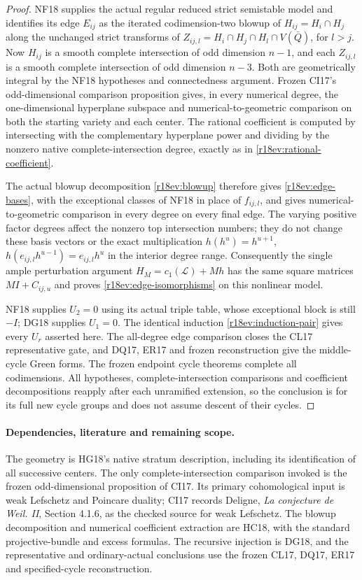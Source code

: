 \begin{proof}
NF18 supplies the actual regular reduced strict semistable
model and identifies its edge $E_{ij}$ as the iterated
codimension-two blowup of
$H_{ij}=H_i\cap H_j$ along the unchanged strict transforms
of $Z_{ij,l}=H_i\cap H_j\cap H_l\cap V(\bar Q)$,
for $l>j$.
Now $H_{ij}$ is a smooth complete intersection of odd
dimension $n-1$, and each $Z_{ij,l}$ is a smooth complete
intersection of odd dimension $n-3$.  Both are geometrically
integral by the NF18 hypotheses and connectedness argument.
Frozen CI17's odd-dimensional comparison proposition gives,
in every numerical degree, the one-dimensional hyperplane
subspace and numerical-to-geometric comparison on both
the starting variety and each center.  The rational
coefficient is computed by intersecting with the complementary
hyperplane power and dividing by the nonzero native
complete-intersection degree, exactly as in
\eqref{r18ev:rational-coefficient}.

The actual blowup decomposition
\eqref{r18ev:blowup} therefore gives
\eqref{r18ev:edge-bases}, with the exceptional classes of
NF18 in place of $f_{ij,l}$, and gives numerical-to-geometric
comparison in every degree on every final edge.
The varying positive factor degrees affect the nonzero
top intersection numbers; they do not change these basis
vectors or the exact multiplication
$h(h^u)=h^{u+1}$,
$h(e_{ij,l}h^{u-1})=e_{ij,l}h^u$
in the interior degree range.
Consequently the single ample perturbation argument
$H_M=c_1(\mathcal L)+Mh$ has the same square matrices
$MI+C_{ij,u}$ and proves
\eqref{r18ev:edge-isomorphisms} on this nonlinear model.

NF18 supplies $U_2=0$ using its actual triple table, whose
exceptional block is still $-I$; DG18 supplies $U_1=0$.
The identical induction \eqref{r18ev:induction-pair} gives
every $U_r$ asserted here.
The all-degree edge comparison closes the CL17
representative gate, and DQ17, ER17 and frozen reconstruction
give the middle-cycle Green forms.  The frozen endpoint
cycle theorems complete all codimensions.
All hypotheses, complete-intersection comparisons and
coefficient decompositions reapply after each unramified
extension, so the conclusion is for its full new cycle
groups and does not assume descent of their cycles.
\end{proof}

\paragraph{Dependencies, literature and remaining scope.}
The geometry is HG18's native stratum description, including
its identification of all successive centers.
The only complete-intersection comparison invoked is the
frozen odd-dimensional proposition of CI17.  Its primary
cohomological input is weak Lefschetz and Poincare duality;
CI17 records Deligne, \emph{La conjecture de Weil. II},
Section 4.1.6, as the checked source for weak Lefschetz.
The blowup decomposition and numerical coefficient extraction
are HC18, with the standard projective-bundle and excess
formulas.  The recursive injection is DG18, and the
representative and ordinary-actual conclusions use the
frozen CL17, DQ17, ER17 and specified-cycle reconstruction.

